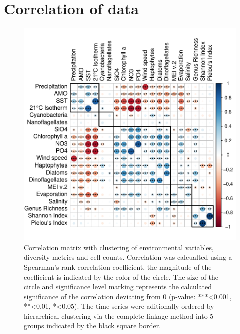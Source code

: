 \documentclass[draft]{agujournal2019}
\begin{document}


%
%
%
%

\appendix
\newpage
\section{Correlation of data}

\begin{figure}[h!]
\noindent\includegraphics[width=\textwidth]{fig/CorrClustSupplementalPlot_v1.pdf}
\caption{Correlation matrix with clustering of environmental variables, diversity metrics and cell counts. Correlation was calcualted using a Spearman's rank correlation coefficient, the magnitude of the coefficient is indicated by the color of the circle. The size of the circle and significance level marking represents the calculated significance of the correlation deviating from 0 (p-value: ***\textless0.001, **\textless0.01, *\textless0.05). The time series were aditionally ordered by hierarchical clustering via the complete linkage method into 5 groups indicated by the black square border.}
\label{fig:sup:correlation}
\end{figure}
\end{document}
